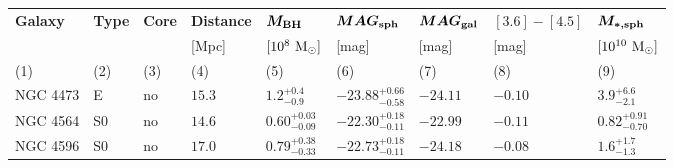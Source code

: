 \begin{table*}                                        
\small                                                
\begin{center}                                        
\begin{tabular}{lllllllll}                           
\hline                                                
\multicolumn{1}{l}{{\bf Galaxy}} &                   
\multicolumn{1}{l}{{\bf Type}} &                     
\multicolumn{1}{l}{{\bf Core}} &                     
\multicolumn{1}{l}{{\bf Distance}} &                 
\multicolumn{1}{l}{{\bf $\bm{M_{\rm BH}}$}} &  
\multicolumn{1}{l}{{\bf $\bm{MAG_{\rm sph}}$}} &  
\multicolumn{1}{l}{{\bf $\bm{MAG_{\rm gal}}$}} &  
\multicolumn{1}{l}{{\bf $\bm{[3.6]-[4.5]}$}} &  
\multicolumn{1}{l}{{\bf $\bm{M_{\rm *,sph}}$}} \\  
\multicolumn{1}{l}{} &                                
\multicolumn{1}{l}{} &                                
\multicolumn{1}{l}{} &                                
\multicolumn{1}{l}{[Mpc]} &                           
\multicolumn{1}{l}{$[10^8~\rm M_{\odot}]$} &         
\multicolumn{1}{l}{[mag]} &                                
\multicolumn{1}{l}{[mag]} &                                
\multicolumn{1}{l}{[mag]} &                                
\multicolumn{1}{l}{$[10^{10}~\rm M_{\odot}]$} \\                             
\multicolumn{1}{l}{(1)} &                             
\multicolumn{1}{l}{(2)} &                             
\multicolumn{1}{l}{(3)} &                             
\multicolumn{1}{l}{(4)} &                             
\multicolumn{1}{l}{(5)} &                             
\multicolumn{1}{l}{(6)} &                             
\multicolumn{1}{l}{(7)} &                             
\multicolumn{1}{l}{(8)} &                             
\multicolumn{1}{l}{(9)} \\                         
\hline                                                
NGC 4473  &  E  &  no   &  $15.3$  &  $1.2_{-0.9}^{+0.4}$   &  $-23.88_{-0.58}^{+0.66}$   &  $-24.11$   &  $-0.10$  &  $3.9_{-2.1}^{+6.6}$   \\ 
NGC 4564  &  S0  &  no   &  $14.6$  &  $0.60_{-0.09}^{+0.03}$   &  $-22.30_{-0.11}^{+0.18}$   &  $-22.99$   &  $-0.11$  &  $0.82_{-0.70}^{+0.91}$   \\ 
NGC 4596  &  S0  &  no   &  $17.0$  &  $0.79_{-0.33}^{+0.38}$   &  $-22.73_{-0.11}^{+0.18}$   &  $-24.18$   &  $-0.08$  &  $1.6_{-1.3}^{+1.7}$   \\ 

\end{tabular}
\end{center}
\end{table*}
